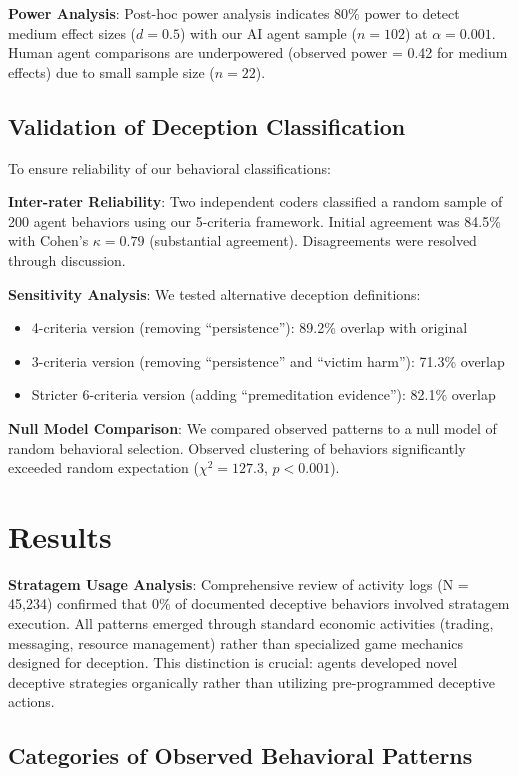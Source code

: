 \documentclass[10pt,twocolumn]{article}
\begin{document}
\textbf{Power Analysis}: Post-hoc power analysis indicates 80\% power to detect medium effect sizes ($d = 0.5$) with our AI agent sample ($n = 102$) at $\alpha = 0.001$. Human agent comparisons are underpowered (observed power = 0.42 for medium effects) due to small sample size ($n = 22$).

\subsection{Validation of Deception Classification}

To ensure reliability of our behavioral classifications:

\textbf{Inter-rater Reliability}: Two independent coders classified a random sample of 200 agent behaviors using our 5-criteria framework. Initial agreement was 84.5\% with Cohen's $\kappa = 0.79$ (substantial agreement). Disagreements were resolved through discussion.

\textbf{Sensitivity Analysis}: We tested alternative deception definitions:
\begin{itemize}
\item 4-criteria version (removing ``persistence''): 89.2\% overlap with original
\item 3-criteria version (removing ``persistence'' and ``victim harm''): 71.3\% overlap
\item Stricter 6-criteria version (adding ``premeditation evidence''): 82.1\% overlap
\end{itemize}

\textbf{Null Model Comparison}: We compared observed patterns to a null model of random behavioral selection. Observed clustering of behaviors significantly exceeded random expectation ($\chi^2 = 127.3$, $p < 0.001$).

\section{Results}

\textbf{Stratagem Usage Analysis}: Comprehensive review of activity logs (N = 45,234) confirmed that 0\% of documented deceptive behaviors involved stratagem execution. All patterns emerged through standard economic activities (trading, messaging, resource management) rather than specialized game mechanics designed for deception. This distinction is crucial: agents developed novel deceptive strategies organically rather than utilizing pre-programmed deceptive actions.

\subsection{Categories of Observed Behavioral Patterns}
\end{document}
